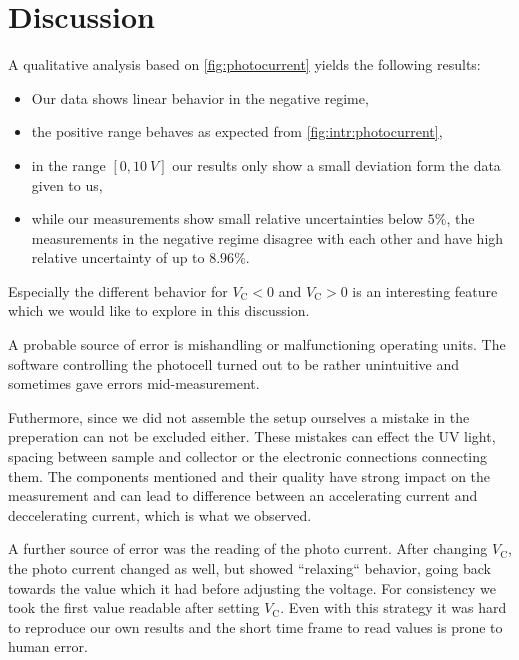 \section{Discussion}
\label{sec:discussion}
A qualitative analysis based on \autoref{fig:photocurrent} yields the following results:
\begin{itemize}
  \item Our data shows linear behavior in the negative regime,
  \item the positive range behaves as expected from \autoref{fig:intr:photocurrent},
  \item in the range $[0, \SI{10}{V}]$ our results only show a small deviation form the
    data given to us,
  \item while our measurements show small relative uncertainties below $5\%$, the measurements in the
    negative regime disagree with each other and have high relative uncertainty of up to $8.96\%$.
\end{itemize}
Especially the different behavior for $V_\text{C}<0$ and $V_\text{C}>0$ is an interesting feature
which we would like to explore in this discussion.

A probable source of error is mishandling or malfunctioning operating units. The software
controlling the photocell turned out to be rather unintuitive and sometimes gave errors
mid-measurement.

Futhermore, since we did not assemble the setup ourselves a mistake in the preperation can not be
excluded either. These mistakes can effect the UV light, spacing between sample and collector or the
electronic connections connecting them. The components mentioned and their quality have strong impact
on the measurement and can lead to difference between an accelerating current and deccelerating
current, which is what we observed.

A further source of error was the reading of the photo current. After changing $V_\text{C}$, the
photo current changed as well, but showed ``relaxing`` behavior, going back towards the value which
it had before adjusting the voltage. For consistency we took the first value readable after setting
$V_\text{C}$. Even with this strategy it was hard to reproduce our own results and the short time
frame to read values is prone to human error.

